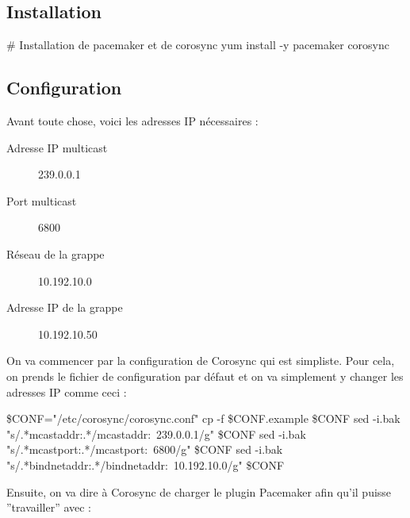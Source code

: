 \documentclass[11pt,a4paper]{report}
\begin{document}
            \subsection{Installation}
            
                \begin{bashcode}
                    # Installation de pacemaker et de corosync
                    yum install -y pacemaker corosync
                \end{bashcode}
            
            \subsection{Configuration}
            
                Avant toute chose, voici les adresses IP nécessaires :\\
                
                \begin{description}
                    \item[Adresse IP multicast] 239.0.0.1
                    \item[Port multicast] 6800
                    \item[Réseau de la grappe] 10.192.10.0
                    \item[Adresse IP de la grappe] 10.192.10.50
                \end{description}
                
                On va commencer par la configuration de Corosync qui est simpliste. Pour cela, on prends le fichier de configuration par défaut et on va simplement y changer les adresses IP comme ceci :\\
                
                \begin{bashcode}
                    \$CONF="/etc/corosync/corosync.conf"
                    cp -f \$CONF.example \$CONF
                    sed -i.bak "s/.*mcastaddr:.*/mcastaddr:\ 239.0.0.1/g" \$CONF
                    sed -i.bak "s/.*mcastport:.*/mcastport:\ 6800/g" \$CONF
                    sed -i.bak "s/.*bindnetaddr:.*/bindnetaddr:\ 10.192.10.0/g" \$CONF
                \end{bashcode}
                
                Ensuite, on va dire à Corosync de charger le plugin Pacemaker afin qu'il puisse ''travailler'' avec :\\
                
\end{document}
